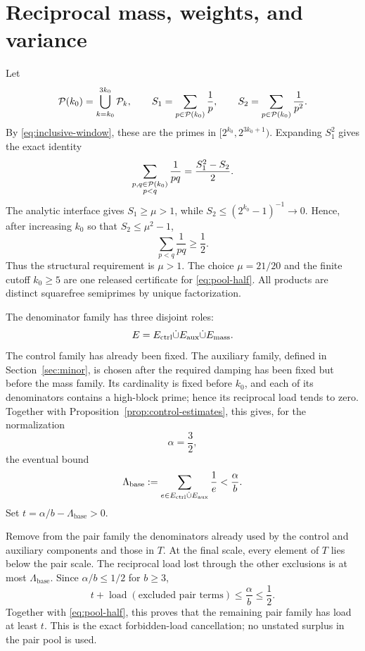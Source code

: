 \section{Reciprocal mass, weights, and variance}\label{sec:mass}

Let
\[
 \mathcal P(k_0)=\bigcup_{k=k_0}^{3k_0}\mathcal P_k,
 \qquad
 S_1=\sum_{p\in\mathcal P(k_0)}\frac1p,
 \qquad
 S_2=\sum_{p\in\mathcal P(k_0)}\frac1{p^2}.
\]
By \eqref{eq:inclusive-window}, these are the primes in
$[2^{k_0},2^{3k_0+1})$.  Expanding $S_1^2$ gives the exact identity
\begin{equation}\label{eq:pair-pool}
 \sum_{\substack{p,q\in\mathcal P(k_0)\\p<q}}\frac1{pq}
 =\frac{S_1^2-S_2}{2}.
\end{equation}
The analytic interface gives $S_1\ge\mu>1$, while
$S_2\le(2^{k_0}-1)^{-1}\to0$.  Hence, after increasing $k_0$ so that
$S_2\le\mu^2-1$,
\begin{equation}\label{eq:pool-half}
 \sum_{p<q}\frac1{pq}\ge\frac12.
\end{equation}
Thus the structural requirement is $\mu>1$.  The choice $\mu=21/20$ and the
finite cutoff $k_0\ge5$ are one released certificate for
\eqref{eq:pool-half}.  All products are distinct squarefree semiprimes by unique
factorization.

The denominator family has three disjoint roles:
\begin{equation}\label{eq:denominator-decomposition}
 E=E_{\mathrm{ctrl}}\dot\cup E_{\mathrm{aux}}\dot\cup E_{\mathrm{mass}}.
\end{equation}
The control family has already been fixed.  The auxiliary family, defined in
Section~\ref{sec:minor}, is chosen after the required damping has been fixed but
before the mass family.  Its cardinality is fixed before $k_0$, and each of its
denominators contains a high-block prime; hence its reciprocal load tends to
zero.  Together with Proposition~\ref{prop:control-estimates}, this gives, for
the normalization
\begin{equation}\label{eq:alpha}
 \alpha=\frac32,
\end{equation}
the eventual bound
\begin{equation}\label{eq:base-load}
 \Lambda_{\mathrm{base}}:=
 \sum_{e\in E_{\mathrm{ctrl}}\dot\cup E_{\mathrm{aux}}}\frac1e
 <\frac\alpha b.
\end{equation}
Set $t=\alpha/b-\Lambda_{\mathrm{base}}>0$.

Remove from the pair family the denominators already used by the control and
auxiliary components and those in $T$.  At the final scale, every element of
$T$ lies below the pair scale.  The reciprocal load lost through the other
exclusions is at most $\Lambda_{\mathrm{base}}$.  Since $\alpha/b\le1/2$ for
$b\ge3$,
\[
 t+\operatorname{load}(\text{excluded pair terms})
 \le\frac\alpha b\le\frac12.
\]
Together with \eqref{eq:pool-half}, this proves that the remaining pair family
has load at least $t$.  This is the exact forbidden-load cancellation; no
unstated surplus in the pair pool is used.

